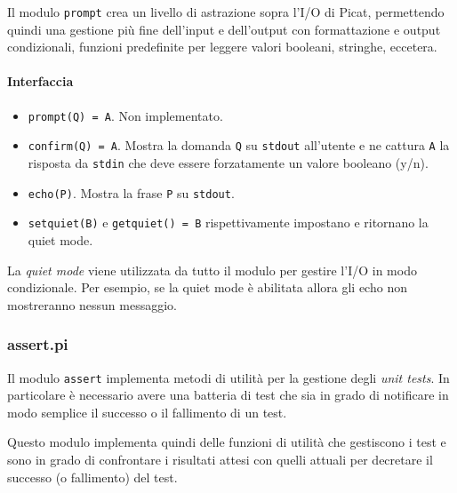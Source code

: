 \documentclass[12pt,a4paper,openright]{book} %
\begin{document}
Il modulo \texttt{prompt} crea un livello di astrazione sopra l'I/O di Picat, permettendo quindi una gestione più fine dell'input e dell'output  con formattazione e output condizionali, funzioni predefinite per leggere valori booleani, stringhe, eccetera.

\paragraph{Interfaccia}

\begin{itemize}
	\item \texttt{prompt(Q) = A}. Non implementato.
	\item \texttt{confirm(Q) = A}. Mostra la domanda \texttt{Q} su \texttt{stdout} all'utente e ne cattura \texttt{A} la risposta da \texttt{stdin} che deve essere forzatamente un valore booleano (y/n).
	\item \texttt{echo(P)}. Mostra la frase \texttt{P} su \texttt{stdout}.
	\item \texttt{set\textunderscore quiet(B)} e \texttt{get\textunderscore quiet() = B} rispettivamente impostano e ritornano la quiet mode.
\end{itemize}

La \emph{quiet mode} viene utilizzata da tutto il modulo per gestire l'I/O in modo condizionale. Per esempio, se la quiet mode è abilitata allora gli echo non mostreranno nessun messaggio.

\subsubsection{assert.pi}

Il modulo \texttt{assert} implementa metodi di utilità per la gestione degli \emph{unit tests}. In particolare è necessario avere una batteria di test che sia in grado di notificare in modo semplice il successo o il fallimento di un test.

Questo modulo implementa quindi delle funzioni di utilità che gestiscono i test e sono in grado di confrontare i risultati attesi con quelli attuali per decretare il successo (o fallimento) del test.
\end{document}
